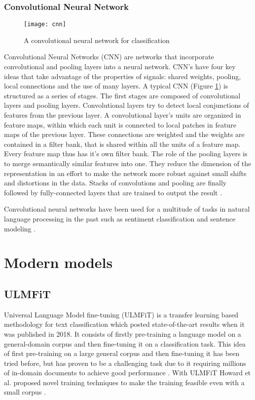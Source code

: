 \subsubsection{Convolutional Neural Network}\label{CNN}
\begin{figure}[t]
\texttt{[image: cnn]}
\centering
\caption{A convolutional neural network for classification}
\label{fig:cnn}
\end{figure}
Convolutional Neural Networks (CNN) are networks that incorporate convolutional and pooling layers into a neural network.
CNN's have four key ideas that take advantage of the properties of signals: shared weights, pooling, local connections and the use of many layers.
A typical CNN (Figure \ref{fig:cnn}) is structured as a series of stages.
The first stages are composed of convolutional layers and pooling layers.
Convolutional layers try to detect local conjunctions of features from the previous layer.
A convolutional layer's units are organized in feature maps, within which each unit is connected to local patches in feature maps of the previous layer.
These connections are weighted and the weights are contained in a filter bank, that is shared within all the units of a feature map.
Every feature map thus has it's own filter bank.
The role of the pooling layers is to merge semantically similar features into one.
They reduce the dimension of the representation in an effort to make the network more robust against small shifts and distortions in the data.
Stacks of convolutions and pooling are finally followed by fully-connected layers that are trained to output the result \cite{lecun2015}.


Convolutional neural networks have been used for a multitude of tasks in natural language processing in the past such as sentiment classification and sentence modeling \cite{kalchbrenner2014}.


\section{Modern models} \label{Modern models}

\subsection{ULMFiT} \label{ULMFiT}
Universal Language Model fine-tuning (ULMFiT) is a transfer learning based methodology for text classification which posted state-of-the-art results when it was published in 2018.
It consists of firstly pre-training a language model on a general-domain corpus and then fine-tuning it on a classification task.
This idea of first pre-training on a large general corpus and then fine-tuning it has been tried before, but has proven to be a challenging task due to it requiring millions of in-domain documents to achieve good performance \cite{dai2015}.
With ULMFiT Howard et al. proposed novel training techniques to make the training feasible even with a small corpus \cite{howard2018}.

